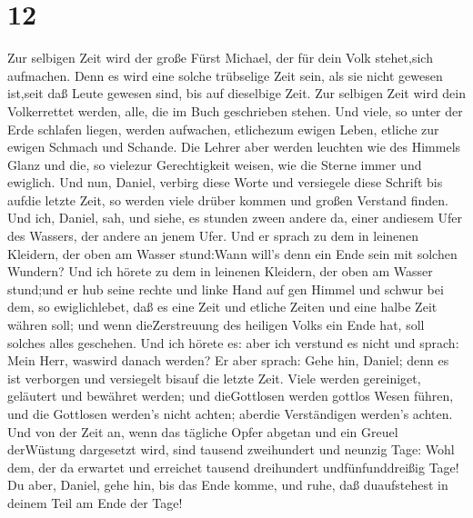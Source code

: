 \hypertarget{section-11}{%
\section{12}\label{section-11}}

 Zur selbigen Zeit wird der große Fürst Michael, der für
dein Volk stehet,sich aufmachen. Denn es wird eine solche trübselige
Zeit sein, als sie nicht gewesen ist,seit daß Leute gewesen sind, bis
auf dieselbige Zeit. Zur selbigen Zeit wird dein Volkerrettet werden,
alle, die im Buch geschrieben stehen.  Und viele, so unter
der Erde schlafen liegen, werden aufwachen, etlichezum ewigen Leben,
etliche zur ewigen Schmach und Schande.  Die Lehrer aber
werden leuchten wie des Himmels Glanz und die, so vielezur Gerechtigkeit
weisen, wie die Sterne immer und ewiglich.  Und nun, Daniel,
verbirg diese Worte und versiegele diese Schrift bis aufdie letzte Zeit,
so werden viele drüber kommen und großen Verstand finden. 
Und ich, Daniel, sah, und siehe, es stunden zween andere da, einer
andiesem Ufer des Wassers, der andere an jenem Ufer.  Und er
sprach zu dem in leinenen Kleidern, der oben am Wasser stund:Wann will's
denn ein Ende sein mit solchen Wundern?  Und ich hörete zu
dem in leinenen Kleidern, der oben am Wasser stund;und er hub seine
rechte und linke Hand auf gen Himmel und schwur bei dem, so
ewiglichlebet, daß es eine Zeit und etliche Zeiten und eine halbe Zeit
währen soll; und wenn dieZerstreuung des heiligen Volks ein Ende hat,
soll solches alles geschehen.  Und ich hörete es: aber ich
verstund es nicht und sprach: Mein Herr, waswird danach werden?
 Er aber sprach: Gehe hin, Daniel; denn es ist verborgen und
versiegelt bisauf die letzte Zeit.  Viele werden
gereiniget, geläutert und bewähret werden; und dieGottlosen werden
gottlos Wesen führen, und die Gottlosen werden's nicht achten; aberdie
Verständigen werden's achten.  Und von der Zeit an, wenn
das tägliche Opfer abgetan und ein Greuel derWüstung dargesetzt wird,
sind tausend zweihundert und neunzig Tage:  Wohl dem, der
da erwartet und erreichet tausend dreihundert undfünfunddreißig Tage!
 Du aber, Daniel, gehe hin, bis das Ende komme, und ruhe,
daß duaufstehest in deinem Teil am Ende der Tage!
